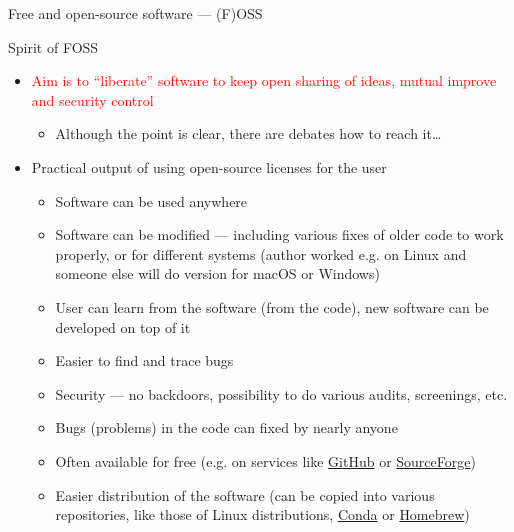 \documentclass[compress, xelatex, 11pt, xcolor=svgnames, aspectratio=169,
	hyperref={
		bookmarks=true,
		unicode=true,
		colorlinks=true,
		pdftitle={Linux, command line and MetaCentrum},
		plainpages=false,
		pdfauthor={Vojtech Zeisek},
		pdfsubject={Course about use of Linux command line, writing shell scripts and using MetaCentrum of CESNET},
		pdfcreator={XeLaTeX},
		pdfkeywords={Linux, GNU, BASH, shell, command line, MetaCentrum},
		linkcolor=DarkRed, %
		anchorcolor=DarkBlue, %
		citecolor=Indigo, %
		filecolor=NavyBlue, %
		menucolor=DarkMagenta, %
		urlcolor=DarkBlue, %
		},
	url={hyphens, lowtilde} %
	]{beamer}
\renewcommand{\alert}[1]{\textcolor{red}{#1}}
\begin{document}
\begin{frame}[allowframebreaks]{Free and open-source software --- (F)OSS}
\begin{block}{Spirit of FOSS}
\begin{itemize}
			\item \alert{Aim is to \enquote{liberate} software to keep open sharing of ideas, mutual improve and security control}
			\begin{itemize}
				\item Although the point is clear, there are debates how to reach it\ldots
			\end{itemize}
		\end{itemize}
	\end{block}
	\begin{itemize}
		\item Practical output of using open-source licenses for the user
		\begin{itemize}
			\item Software can be used anywhere
			\item Software can be modified --- including various fixes of older code to work properly, or for different systems (author worked e.g. on Linux and someone else will do version for macOS or Windows)
			\item User can learn from the software (from the code), new software can be developed on top of it
			\item Easier to find and trace bugs
			\item Security --- no backdoors, possibility to do various audits, screenings, etc.
			\item Bugs (problems) in the code can fixed by nearly anyone
			\item Often available for free (e.g. on services like \href{https://github.com/}{GitHub} or \href{https://sourceforge.net/}{SourceForge})
			\item Easier distribution of the software (can be copied into various repositories, like those of Linux distributions, \href{https://docs.conda.io/}{Conda} or \href{https://brew.sh/}{Homebrew})
		\end{itemize}
	\end{itemize}
\end{frame}
\end{document}

